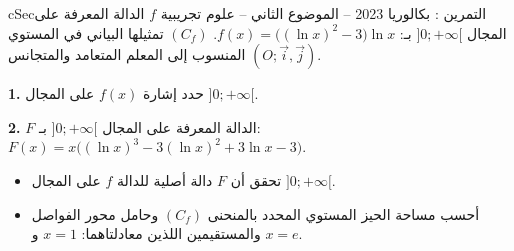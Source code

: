 \documentclass[12pt,a4paper]{article}
\newenvironment{BOX}[2]{\begin{otherlanguage}{english}\begin{arbox}{#1}{#2}}{\end{arbox}\end{otherlanguage}}
\newcounter{exo}
\newenvironment{tamrin}[1]{\stepcounter{exo}\begin{BOX}{cSec}{التمرين \theexo: #1}}{\end{BOX}}
\newenvironment{sq}{\begin{itemize}[leftmargin=2.4em,itemsep=3pt]}{\end{itemize}}
\newcommand{\qa}{\item[(أ)]}\newcommand{\qb}{\item[(ب)]}\newcommand{\qc}{\item[(جـ)]}\newcommand{\qd}{\item[(د)]}\newcommand{\qe}{\item[(هـ)]}
\newcommand{\QQ}[1]{\par\smallskip\textbf{#1.} }
\begin{document}
\begin{tamrin}{بكالوريا 2023 -- الموضوع الثاني -- علوم تجريبية}
$f$ الدالة المعرفة على المجال $]0;+\infty[$ بـ: $f(x)=\big((\ln x)^2-3\big)\ln x$.
$(C_f)$ تمثيلها البياني في المستوي المنسوب إلى المعلم المتعامد والمتجانس $(O;\vec i,\vec j)$.
\QQ{1} حدد إشارة $f(x)$ على المجال $]0;+\infty[$.
\QQ{2} $F$ الدالة المعرفة على المجال $]0;+\infty[$ بـ: $F(x)=x\big((\ln x)^3-3(\ln x)^2+3\ln x-3\big)$.
\begin{sq}
\qa تحقق أن $F$ دالة أصلية للدالة $f$ على المجال $]0;+\infty[$.
\qb أحسب مساحة الحيز المستوي المحدد بالمنحنى $(C_f)$ وحامل محور الفواصل والمستقيمين اللذين معادلتاهما: $x=1$ و $x=e$.
\end{sq}
\end{tamrin}
\end{document}
